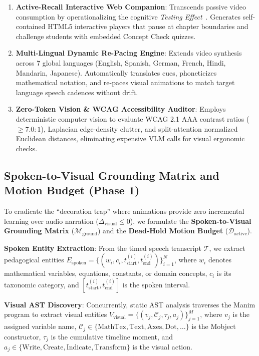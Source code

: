 \documentclass{article}
\begin{document}
\begin{enumerate}
    \item \textbf{Active-Recall Interactive Web Companion}: Transcends passive video consumption by operationalizing the cognitive \textit{Testing Effect}~\cite{roediger2006test}. Generates self-contained HTML5 interactive players that pause at chapter boundaries and challenge students with embedded Concept Check quizzes.
    \item \textbf{Multi-Lingual Dynamic Re-Pacing Engine}: Extends video synthesis across 7 global languages (English, Spanish, German, French, Hindi, Mandarin, Japanese). Automatically translates cues, phoneticizes mathematical notation, and re-paces visual animations to match target language speech cadences without drift.
    \item \textbf{Zero-Token Vision \& WCAG Accessibility Auditor}: Employs deterministic computer vision to evaluate WCAG 2.1 AAA contrast ratios ($\ge 7.0:1$), Laplacian edge-density clutter, and split-attention normalized Euclidean distances, eliminating expensive VLM calls for visual ergonomic checks.
\end{enumerate}

\subsection{Spoken-to-Visual Grounding Matrix and Motion Budget (Phase 1)}
\label{subsec:grounding_motion}
To eradicate the ``decoration trap'' where animations provide zero incremental learning over audio narration ($\Delta_{\text{visual}} \le 0$), we formulate the \textbf{Spoken-to-Visual Grounding Matrix} ($\mathcal{M}_{\text{ground}}$) and the \textbf{Dead-Hold Motion Budget} ($\mathcal{D}_{\text{active}}$).

\textbf{Spoken Entity Extraction}: From the timed speech transcript $\mathcal{T}$, we extract pedagogical entities $E_{\text{spoken}} = \{(w_i, c_i, t_{\text{start}}^{(i)}, t_{\text{end}}^{(i)})\}_{i=1}^N$, where $w_i$ denotes mathematical variables, equations, constants, or domain concepts, $c_i$ is its taxonomic category, and $[t_{\text{start}}^{(i)}, t_{\text{end}}^{(i)}]$ is the spoken interval.

\textbf{Visual AST Discovery}: Concurrently, static AST analysis traverses the Manim program to extract visual entities $V_{\text{visual}} = \{(v_j, \mathcal{C}_j, \tau_j, a_j)\}_{j=1}^M$, where $v_j$ is the assigned variable name, $\mathcal{C}_j \in \{\text{MathTex}, \text{Text}, \text{Axes}, \text{Dot}, \dots\}$ is the Mobject constructor, $\tau_j$ is the cumulative timeline moment, and $a_j \in \{\text{Write}, \text{Create}, \text{Indicate}, \text{Transform}\}$ is the visual action.
\end{document}
